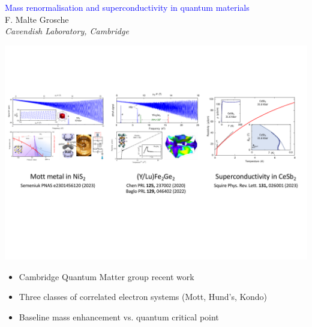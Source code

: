 
\begin{emptyframe}
\begin{center}
\textcolor{Blue}{Mass renormalisation and superconductivity in quantum materials} \\
\vspace{0.5em}
{\footnotesize F. Malte Grosche} \\
{\footnotesize \em Cavendish Laboratory, Cambridge} \\
\vspace{0.1em}
\end{center}
\vspace{0.0em}
\centerline{ \includegraphics[width=\columnwidth]{IntroPicture5}}

\begin{itemize}
    \item<1-> Cambridge Quantum Matter group recent work
    \item<2-> Three classes of correlated electron systems (Mott, Hund's, Kondo)
    \item<3-> Baseline mass enhancement vs. quantum critical point
\end{itemize}
\end{emptyframe}



